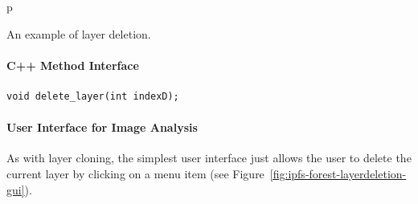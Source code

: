 \begin{stusubfig}{p}
	\\
\caption{An example of layer deletion.}
\label{fig:ipfs-forest-layerdeletion}
\end{stusubfig}

\paragraph{C++ Method Interface}

\begin{lstlisting}[style=Prototype]
void delete_layer(int indexD);
\end{lstlisting}

\paragraph{User Interface for Image Analysis}

As with layer cloning, the simplest user interface just allows the user to delete the current layer by clicking on a menu item (see Figure~\ref{fig:ipfs-forest-layerdeletion-gui}).


